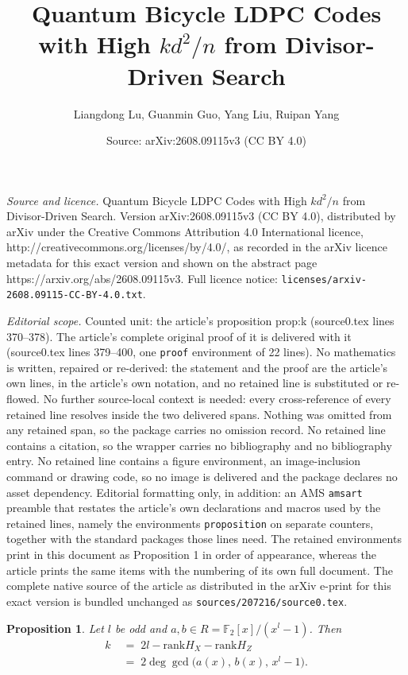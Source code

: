 \documentclass[10pt,a4paper]{amsart}
\title{Quantum Bicycle LDPC Codes with High $kd^2/n$ from Divisor-Driven Search}
\author{Liangdong Lu, Guanmin Guo, Yang Liu, Ruipan Yang}
\date{Source: arXiv:2608.09115v3 (CC BY 4.0)}
\newtheorem{proposition}{Proposition}
\newcommand{\F}{\mathbb{F}}
\newcommand{\rank}{\mathrm{rank}}
\begin{document}
\maketitle

\noindent\emph{Source and licence.} Quantum Bicycle LDPC Codes with High $kd^2/n$ from Divisor-Driven Search. Version arXiv:2608.09115v3 (CC BY 4.0), distributed by arXiv under the Creative Commons Attribution 4.0 International licence, http://creativecommons.org/licenses/by/4.0/, as recorded in the arXiv licence metadata for this exact version and shown on the abstract page https://arxiv.org/abs/2608.09115v3. Full licence notice: \texttt{licenses/arxiv-2608.09115-CC-BY-4.0.txt}.\par\smallskip

\noindent\textit{Editorial scope.} Counted unit: the article's proposition prop:k (source0.tex lines 370--378). The article's complete original proof of it is delivered with it (source0.tex lines 379--400, one \texttt{proof} environment of 22 lines). No mathematics is written, repaired or re-derived: the statement and the proof are the article's own lines, in the article's own notation, and no retained line is substituted or re-flowed.  No further source-local context is needed: every cross-reference of every retained line resolves inside the two delivered spans.  Nothing was omitted from any retained span, so the package carries no omission record.  No retained line contains a citation, so the wrapper carries no bibliography and no bibliography entry.  No retained line contains a figure environment, an image-inclusion command or drawing code, so no image is delivered and the package declares no asset dependency.  Editorial formatting only, in addition: an AMS \texttt{amsart} preamble that restates the article's own declarations and macros used by the retained lines, namely the environments \texttt{proposition} on separate counters, together with the standard packages those lines need.  The retained environments print in this document as Proposition 1 in order of appearance, whereas the article prints the same items with the numbering of its own full document.  The complete native source of the article as distributed in the arXiv e-print for this exact version is bundled unchanged as \texttt{sources/207216/source0.tex}.
\begin{proposition}\label{prop:k}
Let $l$ be odd and $a,b\in R=\F_2[x]/(x^l-1)$. Then
\[
\begin{aligned}
k \;&=\; 2l-\rank H_X-\rank H_Z\\
    &=\; 2\deg\gcd\!\big(a(x),\,b(x),\,x^{l}-1\big).
\end{aligned}
\]
\end{proposition}
\end{document}

